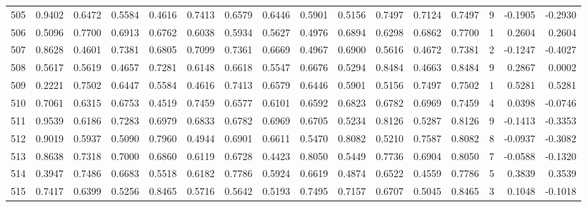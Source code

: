 \begin{tabular}{lrrrrrrrrrrrrrrr}
505 &      0.9402 &  0.6472 &  0.5584 &  0.4616 &  0.7413 &  0.6579 &  0.6446 &  0.5901 &  0.5156 &  0.7497 &   0.7124 &     0.7497 &      9 &                   -0.1905 &                    -0.2930 \\
506 &      0.5096 &  0.7700 &  0.6913 &  0.6762 &  0.6038 &  0.5934 &  0.5627 &  0.4976 &  0.6894 &  0.6298 &   0.6862 &     0.7700 &      1 &                    0.2604 &                     0.2604 \\
507 &      0.8628 &  0.4601 &  0.7381 &  0.6805 &  0.7099 &  0.7361 &  0.6669 &  0.4967 &  0.6900 &  0.5616 &   0.4672 &     0.7381 &      2 &                   -0.1247 &                    -0.4027 \\
508 &      0.5617 &  0.5619 &  0.4657 &  0.7281 &  0.6148 &  0.6618 &  0.5547 &  0.6676 &  0.5294 &  0.8484 &   0.4663 &     0.8484 &      9 &                    0.2867 &                     0.0002 \\
509 &      0.2221 &  0.7502 &  0.6447 &  0.5584 &  0.4616 &  0.7413 &  0.6579 &  0.6446 &  0.5901 &  0.5156 &   0.7497 &     0.7502 &      1 &                    0.5281 &                     0.5281 \\
510 &      0.7061 &  0.6315 &  0.6753 &  0.4519 &  0.7459 &  0.6577 &  0.6101 &  0.6592 &  0.6823 &  0.6782 &   0.6969 &     0.7459 &      4 &                    0.0398 &                    -0.0746 \\
511 &      0.9539 &  0.6186 &  0.7283 &  0.6979 &  0.6833 &  0.6782 &  0.6969 &  0.6705 &  0.5234 &  0.8126 &   0.5287 &     0.8126 &      9 &                   -0.1413 &                    -0.3353 \\
512 &      0.9019 &  0.5937 &  0.5090 &  0.7960 &  0.4944 &  0.6901 &  0.6611 &  0.5470 &  0.8082 &  0.5210 &   0.7587 &     0.8082 &      8 &                   -0.0937 &                    -0.3082 \\
513 &      0.8638 &  0.7318 &  0.7000 &  0.6860 &  0.6119 &  0.6728 &  0.4423 &  0.8050 &  0.5449 &  0.7736 &   0.6904 &     0.8050 &      7 &                   -0.0588 &                    -0.1320 \\
514 &      0.3947 &  0.7486 &  0.6683 &  0.5518 &  0.6182 &  0.7786 &  0.5924 &  0.6619 &  0.4874 &  0.6522 &   0.4559 &     0.7786 &      5 &                    0.3839 &                     0.3539 \\
515 &      0.7417 &  0.6399 &  0.5256 &  0.8465 &  0.5716 &  0.5642 &  0.5193 &  0.7495 &  0.7157 &  0.6707 &   0.5045 &     0.8465 &      3 &                    0.1048 &                    -0.1018 \\

\end{tabular}
